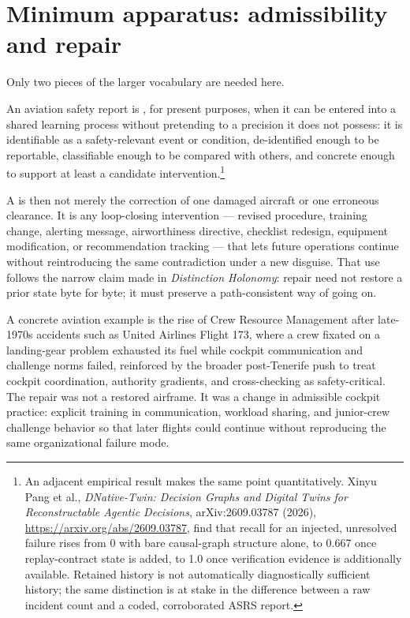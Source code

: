 \documentclass[11pt]{article}
\begin{document}
\section{Minimum apparatus: admissibility and repair}
Only two pieces of the larger vocabulary are needed here.

\begin{definition}
An aviation safety report is \admissible, for present purposes, when it can be entered into a shared learning process without pretending to a precision it does not possess: it is identifiable as a safety-relevant event or condition, de-identified enough to be reportable, classifiable enough to be compared with others, and concrete enough to support at least a candidate intervention.\footnote{An adjacent empirical result makes the same point quantitatively. Xinyu Pang et al., \emph{DNative-Twin: Decision Graphs and Digital Twins for Reconstructable Agentic Decisions}, arXiv:2609.03787 (2026), \url{https://arxiv.org/abs/2609.03787}, find that recall for an injected, unresolved failure rises from 0 with bare causal-graph structure alone, to 0.667 once replay-contract state is added, to 1.0 once verification evidence is additionally available. Retained history is not automatically diagnostically sufficient history; the same distinction is at stake in the difference between a raw incident count and a coded, corroborated ASRS report.}
\end{definition}

A \repair{} is then not merely the correction of one damaged aircraft or one erroneous clearance. It is any loop-closing intervention --- revised procedure, training change, alerting message, airworthiness directive, checklist redesign, equipment modification, or recommendation tracking --- that lets future operations continue without reintroducing the same contradiction under a new disguise. That use follows the narrow claim made in \textit{Distinction Holonomy}: repair need not restore a prior state byte for byte; it must preserve a path-consistent way of going on.

A concrete aviation example is the rise of Crew Resource Management after late-1970s accidents such as United Airlines Flight 173, where a crew fixated on a landing-gear problem exhausted its fuel while cockpit communication and challenge norms failed, reinforced by the broader post-Tenerife push to treat cockpit coordination, authority gradients, and cross-checking as safety-critical. The repair was not a restored airframe. It was a change in admissible cockpit practice: explicit training in communication, workload sharing, and junior-crew challenge behavior so that later flights could continue without reproducing the same organizational failure mode.
\end{document}
